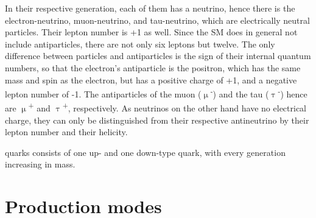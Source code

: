 In their respective generation, each of them has a neutrino, hence there is the electron-neutrino, muon-neutrino, and tau-neutrino, which are electrically neutral particles.
Their lepton number is +1 as well.
Since the SM does in general not include antiparticles, there are not only six leptons but twelve.
The only difference between particles and antiparticles is the sign of their internal quantum numbers, so that the electron's antiparticle is the positron, which has the same mass and spin as the electron, but has a positive charge of +1, and a negative lepton number of -1.
The antiparticles of the muon ($\upmu$\textsuperscript{-}) and the tau ($\uptau$\textsuperscript{-}) hence are $\upmu$\textsuperscript{+} and $\uptau$\textsuperscript{+}, respectively.
As neutrinos on the other hand have no electrical charge, they  can only be distinguished from their respective antineutrino by their lepton number and their helicity. 

quarks consists of one up- and one down-type quark, with every generation increasing in mass.


\section{Production modes}
\label{Production_modes}

